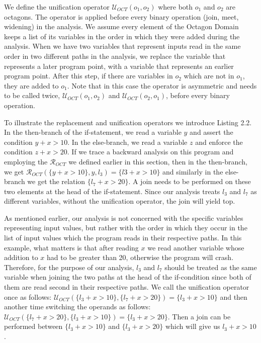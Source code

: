 \documentclass[10pt]{report}
\begin{document}
We define the unification operator $ \mathcal{U}_{OCT}(o_{1}, o_{2}) $ where both $ o_{1} $ and $ o_{2} $ are octagons. The operator is applied before every binary operation (join, meet, widening) in the analysis. We assume every element of the Octagon Domain keeps a list of its variables in the order in which they were added during the analysis. When we have two variables that represent inputs read in the same order in two different paths in the analysis, we replace the variable that represents a later program point, with a variable that represents an earlier program point. After this step, if there are variables in $ o_{2} $ which are not in $ o_{1} $, they are added to $ o_{1} $. Note that in this case the operator is asymmetric and needs to be called twice, $ \mathcal{U}_{OCT}(o_{1}, o_{2}) $ and $ \mathcal{U}_{OCT}(o_{2}, o_{1}) $, before every binary operation. 


To illustrate the replacement and unification operators we introduce Listing 2.2. In the then-branch of the if-statement, we read a variable $ y $ and assert the condition $ y + x > 10 $. In the else-branch, we read a variable $ z $ and enforce the condition $ z + x > 20 $. If we trace a backward analysis on this program and employing the $ \mathcal{R}_{OCT} $ we defined earlier in this section, then in the then-branch, we get $\mathcal{R}_{OCT}(\lbrace y + x > 10\rbrace, y, l_{3}) = \lbrace l3 + x > 10 \rbrace$ and similarly in the else-branch we get the relation $ \lbrace l_{7} + x > 20 \rbrace$. A join needs to be performed on these two elements at the head of the if-statement. Since our analysis treats $ l_{3} $ and $ l_{7} $ as different variables, without the unification operator, the join will yield top. 

 As mentioned earlier, our analysis is not concerned with the specific variables representing input values, but rather with the order in which they occur in the list of input values which the program reads in their respective paths. In this example, what matters is that after reading $ x $ we read another variable whose addition to $ x $ had to be greater than 20, otherwise the program will crash. Therefore, for the purpose of our analysis, $ l_{3} $  and $ l_{7} $ should be treated as the same variable when joining the two paths at the head of the if-condition since both of them are read second in their respective paths. We call the unification operator once as follows: $ \mathcal{U}_{OCT}(\lbrace l_{3} + x > 10 \rbrace, \lbrace l_{7} + x > 20 \rbrace) =  \lbrace l_{3} + x > 10 \rbrace$ and then another time switching the operands as follows: $ \mathcal{U}_{OCT}(\lbrace l_{7} + x > 20 \rbrace, \lbrace l_{3} + x > 10 \rbrace) =  \lbrace l_{3} + x > 20 \rbrace$. Then a join can be performed between $ \lbrace l_{3} + x > 10 \rbrace $ and $ \lbrace l_{3} + x > 20 \rbrace $ which will give us $ l_{3} + x > 10 $. 
\end{document}
